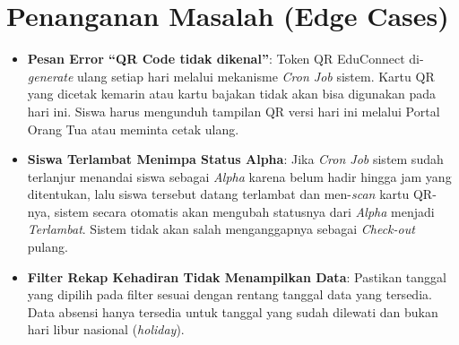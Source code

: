\section{Penanganan Masalah (Edge Cases)}
\begin{itemize}
    \item \textbf{Pesan Error ``QR Code tidak dikenal''}: Token QR EduConnect di-\textit{generate} ulang setiap hari melalui mekanisme \textit{Cron Job} sistem. Kartu QR yang dicetak kemarin atau kartu bajakan tidak akan bisa digunakan pada hari ini. Siswa harus mengunduh tampilan QR versi hari ini melalui Portal Orang Tua atau meminta cetak ulang.
    \item \textbf{Siswa Terlambat Menimpa Status Alpha}: Jika \textit{Cron Job} sistem sudah terlanjur menandai siswa sebagai \textit{Alpha} karena belum hadir hingga jam yang ditentukan, lalu siswa tersebut datang terlambat dan men-\textit{scan} kartu QR-nya, sistem secara otomatis akan mengubah statusnya dari \textit{Alpha} menjadi \textit{Terlambat}. Sistem tidak akan salah menganggapnya sebagai \textit{Check-out} pulang.
    \item \textbf{Filter Rekap Kehadiran Tidak Menampilkan Data}: Pastikan tanggal yang dipilih pada filter sesuai dengan rentang tanggal data yang tersedia. Data absensi hanya tersedia untuk tanggal yang sudah dilewati dan bukan hari libur nasional (\textit{holiday}).
\end{itemize}
